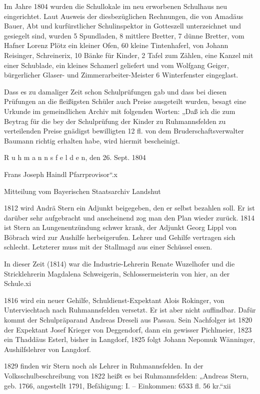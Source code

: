 \documentclass{book}
\begin{document}
Im Jahre 1804 wurden die Schullokale im neu erworbenen Schulhaus neu
eingerichtet. Laut Ausweis der diesbezüglichen Rechnungen, die von Amadäus
Bauer, Abt und kurfürstlicher Schulinspektor in Gotteszell unterzeichnet und
gesiegelt sind, wurden 5 Spundladen, 8 mittlere Bretter, 7 dünne Bretter, vom
Hafner Lorenz Plötz ein kleiner Ofen, 60 kleine Tintenhaferl, von Johann
Reisinger, Schreinerix, 10 Bänke für Kinder, 2 Tafel zum Zählen, eine Kanzel mit
einer Schublade, ein kleines Schamerl geliefert und vom Wolfgang Geiger,
bürgerlicher Glaser- und Zimmerarbeiter-Meister 6 Winterfenster eingeglast.

Dass es zu damaliger Zeit schon Schulprüfungen gab und dass bei diesen Prüfungen
an die fleißigsten Schüler auch Preise ausgeteilt wurden, besagt eine Urkunde im
gemeindlichen Archiv mit folgenden Worten: „Daß ich die zum Beytrag für die bey
der Schulprüfung der Kinder zu Ruhmannsfelden zu verteilenden Preise gnädigst
bewilligten 12 fl. von dem Bruderschaftsverwalter Baumann richtig erhalten habe,
wird hiermit bescheinigt.

 R u h m a n n s f e l d e n, den 26. Sept. 1804

    Frans Joseph Haindl Pfarrprovisor“.x

Mitteilung vom Bayerischen Staatsarchiv Landshut

1812 wird Andrä Stern ein Adjunkt beigegeben, den er selbst bezahlen soll. Er
ist darüber sehr aufgebracht und anscheinend zog man den Plan wieder zurück.
1814 ist Stern an Lungenentzündung schwer krank, der Adjunkt Georg Lippl von
Böbrach wird zur Aushilfe herbeigerufen. Lehrer und Gehilfe vertragen sich
schlecht. Letzterer muss mit der Stallmagd aus einer Schüssel essen.

In dieser Zeit (1814) war die Industrie-Lehrerin Renate Wuzelhofer und die
Stricklehrerin Magdalena Schweigerin, Schlossermeisterin von hier, an der
Schule.xi

1816 wird ein neuer Gehilfe, Schuldienst-Expektant Alois Rokinger, von
Unterviechtach nach Ruhmannsfelden versetzt. Er ist aber nicht auffindbar. Dafür
kommt der Schulpräparand Andreas Dreseli aus Passau. Sein Nachfolger ist 1820
der Expektant Josef Krieger von Deggendorf, dann ein gewisser Pichlmeier, 1823
ein Thaddäus Esterl, bisher in Langdorf, 1825 folgt Johann Nepomuk Wänninger,
Aushilfslehrer von Langdorf.

1829 finden wir Stern noch als Lehrer in Ruhmannsfelden. In der
Volksschulbeschreibung von 1822 heißt es bei Ruhmannsfelden: „Andreas Stern,
geb. 1766, angestellt 1791, Befähigung: I. – Einkommen: 6533 fl. 56 kr.“xii
\end{document}

